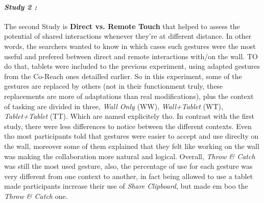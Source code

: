     \paragraph{ \textit{Study 2 :}
                \newline }
    \indent \indent The second Study is \textbf{Direct vs. Remote Touch} that helped to assess the potential of shared interactions whenever they're at different distance. In other words, the searchers wanted to 
    know in which cases such gestures were the most useful and prefered between direct and remote interactions with/on the wall. TO do that, tablets were  included to the previous experiment, using adapted gestures
    from the Co-Reach ones detailled earlier.
    \newline 
    \indent \indent So in this experiment, some of the gestures are replaced by others (not in their functionment truly, these replacements are more of adaptations than real modifications), plus the context of tasking
    are divided in three, \textit{Wall Only} (WW), \textit{Wall+Tablet} (WT), \textit{Tablet+Tablet} (TT). Which are named explicitely tho. In contrast with the first study, there were less differences to notice between 
    the different contexts. Even tho most participants told that gestures were easier to accept and use direclty on the wall, moreover some of them explained that they felt like working on the wall was making the collaboration
    more natural and logical.
    \newline
    \indent \indent Overall, \textit{Throw \& Catch} was still the most used gesture, also, the percentage of use for each gesture was very different from one context to another, in fact being allowed to use a tablet made 
    participants increase their use of \textit{Share Clipboard}, but made em boo the \textit{Throw \& Catch} one.

